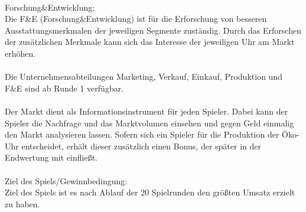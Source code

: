 \\
Forschung\&Entwicklung:\\
Die F\&E (Forschung\&Entwicklung) ist für die Erforschung von besseren Ausstattungsmerkmalen der jeweiligen Segmente zuständig. Durch das Erforschen der zusätzlichen Merkmale kann sich das Interesse der jeweiligen Uhr am Markt erhöhen.\\
\\
Die Unternehmensabteilungen Marketing, Verkauf, Einkauf, Produktion und F\&E sind ab Runde 1 verfügbar.\\
\\
Der Markt dient als Informationsinstrument für jeden Spieler. Dabei kann der Spieler die Nachfrage und das Marktvolumen einsehen und gegen Geld einmalig den Markt analysieren lassen. Sofern sich ein Spieler für die Produktion der Öko-Uhr entscheidet, erhält dieser zusätzlich einen Bonus, der später in der Endwertung mit einfließt.\\ 
\\
Ziel des Spiels/Gewinnbedingung:\\
Ziel des Spiels ist es nach Ablauf der 20 Spielrunden den größten Umsatz erzielt zu haben.


